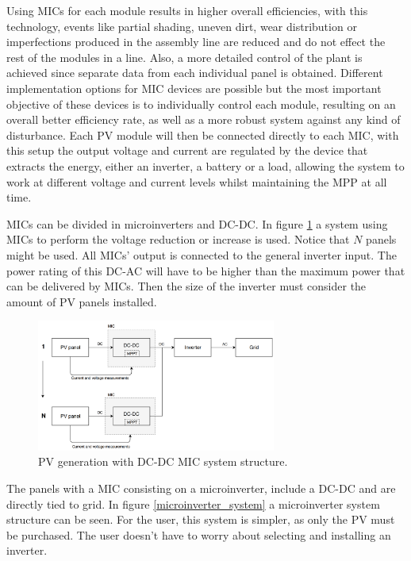 Using MICs for each module results in higher overall efficiencies, with this technology, events like partial shading, uneven dirt, wear distribution or imperfections produced in the assembly line are reduced and do not effect the rest of the modules in a line. Also, a more detailed control of the plant is achieved since separate data from each individual panel is obtained.
Different implementation options for MIC devices are possible but the most important objective of these devices is to individually control each module, resulting on an overall better efficiency rate, as well as a more robust system against any kind of disturbance. Each PV module will then be connected directly to each MIC, with this setup the output voltage and current are regulated by the device that extracts the energy, either an inverter, a battery or a load, allowing the system to work at different voltage and current levels whilst maintaining the MPP at all time. 

MICs can be divided in microinverters and DC-DC. In figure \ref{MIC_dcdc} a system using MICs to perform the voltage reduction or increase is used. Notice that $N$ panels might be used. All MICs' output is connected to the general inverter input. The power rating of this DC-AC will have to be higher than the maximum power that can be delivered by MICs. Then the size of the inverter must consider the amount of PV panels installed.

\begin{figure}[htbp]
	\begin{center}
		\includegraphics[width=0.7\textwidth]{../Pictures/MIC_dcdc}
		\caption{PV generation with DC-DC MIC system structure.}
		\label{MIC_dcdc}
	\end{center}	
\end{figure}

The panels with a MIC consisting on a microinverter, include a DC-DC and are directly tied to grid. In figure \ref{microinverter_system} a microinverter system structure can be seen. For the user, this system is simpler, as only the PV must be purchased. The user doesn't have to worry about selecting and installing an inverter. 

